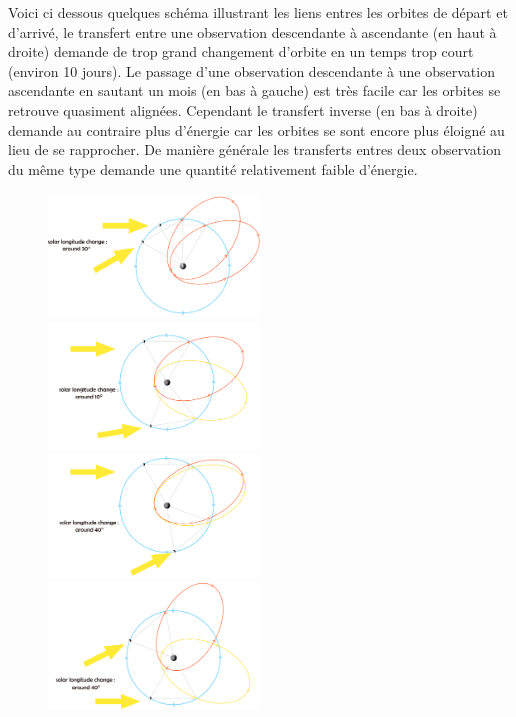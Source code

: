 \documentclass[12pt]{article} %
\begin{document}
		Voici ci dessous quelques schéma illustrant les liens entres les orbites de départ et d'arrivé, le transfert entre une observation descendante à ascendante (en haut à droite) demande de trop grand changement d'orbite en un temps trop court (environ 10 jours). Le passage d'une observation descendante à une observation ascendante en sautant un mois (en bas à gauche) est très facile car les orbites se retrouve quasiment alignées. Cependant le transfert inverse (en bas à droite) demande au contraire plus d'énergie car les orbites se sont encore plus éloigné au lieu de se rapprocher. De manière générale les transferts entres deux observation du même type demande une quantité relativement faible d'énergie.
		\begin{figure}[H]
			\includegraphics[width=0.5\textwidth]{images/1in2obs.png}
			\includegraphics[width=0.5\textwidth]{images/odd_to_even.png}
			\includegraphics[width=0.5\textwidth]{images/1in3_obs.png}
			\includegraphics[width=0.5\textwidth]{images/1in3_bad.png}
		\end{figure}
		
\end{document}
